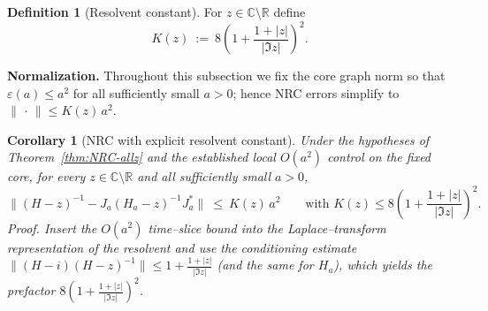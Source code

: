 \documentclass[11pt]{amsart}
\theoremstyle{plain}
\newtheorem{corollary}[theorem]{Corollary}
\theoremstyle{definition}
\newtheorem{definition}[theorem]{Definition}
\theoremstyle{remark}
\renewcommand{\tfrac}[2]{\textstyle\frac{#1}{#2}}
\begin{document}
\begin{definition}[Resolvent constant]\label{def:Kz}
For $z\in\mathbb{C}\setminus\mathbb{R}$ define
\[
K(z)\ :=\ 8\left(1+\frac{1+|z|}{|\Im z|}\right)^{\!2}.
\]
\end{definition}

\begin{mdframed}[linewidth=0.5pt, linecolor=gray!30, backgroundcolor=gray!3, roundcorner=2pt, innertopmargin=8pt, innerbottommargin=8pt, skipabove=10pt, skipbelow=10pt]
\noindent\textbf{Normalization.} Throughout this subsection we fix the core graph norm so that $\varepsilon(a)\le a^2$ for all sufficiently small $a>0$; hence NRC errors simplify to $\|\,\cdot\,\|\le K(z)\,a^2$.
\end{mdframed}

\begin{corollary}[NRC with explicit resolvent constant]\label{cor:NRC-explicit}
Under the hypotheses of Theorem~\ref{thm:NRC-allz} and the established local $O(a^2)$ control on the fixed core, for every $z\in\mathbb{C}\setminus\mathbb{R}$ and all sufficiently small $a>0$,
\[
\bigl\|(H-z)^{-1}-J_a(H_a-z)^{-1}J_a^*\bigr\|\ \le\ K(z)\,a^2
\qquad\text{with }K(z)\le 8\left(1+\frac{1+|z|}{|\Im z|}\right)^{\!2}.
\]
\emph{Proof.} Insert the $O(a^2)$ time--slice bound into the Laplace--transform representation of the resolvent and use the conditioning estimate 
$\|(H-i)(H-z)^{-1}\|\le 1+\tfrac{1+|z|}{|\Im z|}$ (and the same for $H_a$), which yields the prefactor $8\!\left(1+\tfrac{1+|z|}{|\Im z|}\right)^{\!2}$. \qedhere
\end{corollary}
\end{document}
